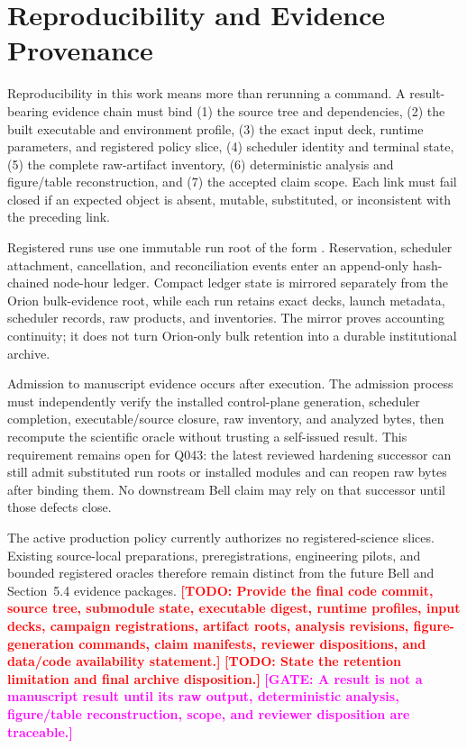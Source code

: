 \documentclass[twocolumn]{aastex701}
\newcommand{\TODO}[1]{\textcolor{red}{\textbf{[TODO: #1]}}}
\newcommand{\GATE}[1]{\textcolor{magenta}{\textbf{[GATE: #1]}}}
\begin{document}
\section{Reproducibility and Evidence Provenance}
\label{sec:reproducibility}

Reproducibility in this work means more than rerunning a command. A
result-bearing evidence chain must bind (1) the source tree and dependencies,
(2) the built executable and environment profile, (3) the exact input deck,
runtime parameters, and registered policy slice, (4) scheduler identity and
terminal state, (5) the complete raw-artifact inventory, (6) deterministic
analysis and figure/table reconstruction, and (7) the accepted claim scope.
Each link must fail closed if an expected object is absent, mutable,
substituted, or inconsistent with the preceding link.

Registered runs use one immutable run root of the form
. Reservation, scheduler attachment,
cancellation, and reconciliation events enter an append-only hash-chained
node-hour ledger. Compact ledger state is mirrored separately from the Orion
bulk-evidence root, while each run retains exact decks, launch metadata,
scheduler records, raw products, and inventories. The mirror proves accounting
continuity; it does not turn Orion-only bulk retention into a durable
institutional archive.

Admission to manuscript evidence occurs after execution. The admission process
must independently verify the installed control-plane generation, scheduler
completion, executable/source closure, raw inventory, and analyzed bytes, then
recompute the scientific oracle without trusting a self-issued result. This
requirement remains open for Q043: the latest reviewed hardening successor can
still admit substituted run roots or installed modules and can reopen raw
bytes after binding them. No downstream Bell claim may rely on that successor
until those defects close.

The active production policy currently authorizes no registered-science
slices. Existing source-local preparations, preregistrations, engineering
pilots, and bounded registered oracles therefore remain distinct from the
future Bell and Section~5.4 evidence packages.
\TODO{Provide the final code commit, source tree, submodule state, executable
digest, runtime profiles, input decks, campaign registrations, artifact roots,
analysis revisions, figure-generation commands, claim manifests, reviewer
dispositions, and data/code availability statement.}
\TODO{State the retention limitation and final archive disposition.}
\GATE{A result is not a manuscript result until its raw output, deterministic
analysis, figure/table reconstruction, scope, and reviewer disposition are
traceable.}
\end{document}
